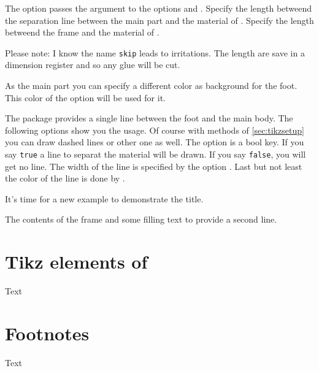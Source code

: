 \documentclass[openany,12pt,tocdepth=3]{ltx-md}
\begin{document}
The option  passes the argument to the options 
and .
Specify the length betweend the separation line between the main part and the material of .
Specify the length betweend the frame and the material of .

\faArrowRight Please note:  I know the name \texttt{skip} leads to irritations. The length are save in a
dimension register and so any glue will be cut.

As the main part you can specify a different color as background for
the foot. This color of the option  will be used for it.


The package  provides a single line between the foot and the main body.
The following options show you the usage. Of course with methods of
\autoref{sec:tikzsetup} you can draw dashed lines or other one as well.
The option  is a bool key. If you say \texttt{true} a line to separat
the material will be drawn. If you say \texttt{false}, you will get no line.
The width of the line is specified by the option .
Last but not least the color of the line is done by .


It's time for a new example to demonstrate the title.

\begin{ltxexample}[caption={Example foot part},label=foot,result=true]
 \begin{xframed}[title-bg-color=brown!30,%
   foot-bg-color=brown!30,line-width=2pt,
   line-color=brown!60,margin=1.5cm,bg-color=yellow!20, 
   first-title={This is the title of the frame},
   last-foot={you reached the end},]
   The contents of the frame and some filling text to 
  provide a second line.
 \end{xframed}
\end{ltxexample}


\section{Tikz elements of  \texorpdfstring{}{xframed}}\label{sec:tikzsetup}
Text 
\section{Footnotes}\label{sec:footnotes}
Text 
\end{document}
